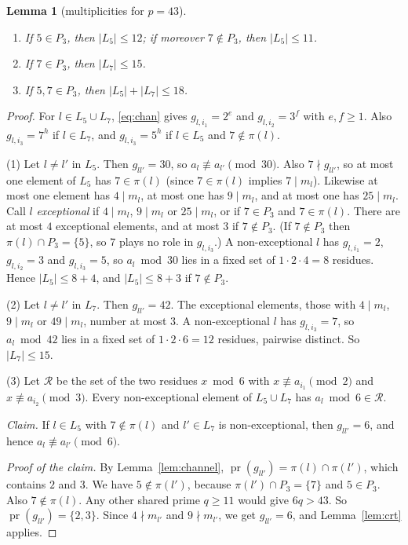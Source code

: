 \documentclass[11pt]{article}
\newtheorem{lemma}[theorem]{Lemma}
\theoremstyle{definition}
\theoremstyle{remark}
\newcommand{\pr}{\operatorname{pr}}
\begin{document}
\begin{lemma}[multiplicities for $p=43$]\label{lem:mult44}
\begin{enumerate}
\item If $5\in P_3$, then $|L_5|\le12$; if moreover $7\notin P_3$, then $|L_5|\le11$.
\item If $7\in P_3$, then $|L_7|\le15$.
\item If $5,7\in P_3$, then $|L_5|+|L_7|\le18$.
\end{enumerate}
\end{lemma}
\begin{proof}
For $l\in L_5\cup L_7$, \eqref{eq:chan} gives $g_{l,i_1}=2^{e}$ and $g_{l,i_2}=3^{f}$ with
$e,f\ge1$. Also $g_{l,i_3}=7^{h}$ if $l\in L_7$, and $g_{l,i_3}=5^{h}$ if $l\in L_5$ and
$7\notin\pi(l)$.

(1) Let $l\ne l'$ in $L_5$. Then $g_{ll'}=30$, so $a_l\not\equiv a_{l'}\pmod{30}$. Also
$7\nmid g_{ll'}$, so at most one element of $L_5$ has $7\in\pi(l)$ (since $7\in\pi(l)$ implies
$7\mid m_l$). Likewise at most one element has $4\mid m_l$, at most one has $9\mid m_l$, and at
most one has $25\mid m_l$. Call $l$ \emph{exceptional} if $4\mid m_l$, $9\mid m_l$ or
$25\mid m_l$, or if $7\in P_3$ and $7\in\pi(l)$. There are at most $4$ exceptional elements, and at
most $3$ if $7\notin P_3$. (If $7\notin P_3$ then $\pi(l)\cap P_3=\{5\}$, so $7$ plays no role in
$g_{l,i_3}$.) A non-exceptional $l$ has
$g_{l,i_1}=2$, $g_{l,i_2}=3$ and $g_{l,i_3}=5$, so $a_l\bmod30$ lies in a fixed set of
$1\cdot2\cdot4=8$ residues. Hence $|L_5|\le8+4$, and $|L_5|\le8+3$ if $7\notin P_3$.

(2) Let $l\ne l'$ in $L_7$. Then $g_{ll'}=42$. The exceptional elements, those with $4\mid m_l$,
$9\mid m_l$ or $49\mid m_l$, number at most $3$. A non-exceptional $l$ has $g_{l,i_3}=7$, so
$a_l\bmod42$ lies in a fixed set of $1\cdot2\cdot6=12$ residues, pairwise distinct. So
$|L_7|\le15$.

(3) Let $\mathcal R$ be the set of the two residues $x\bmod6$ with $x\not\equiv a_{i_1}\pmod2$
and $x\not\equiv a_{i_2}\pmod3$. Every non-exceptional element of $L_5\cup L_7$ has
$a_l\bmod6\in\mathcal R$.

\emph{Claim.} If $l\in L_5$ with $7\notin\pi(l)$ and $l'\in L_7$ is non-exceptional, then
$g_{ll'}=6$, and hence $a_l\not\equiv a_{l'}\pmod 6$.

\emph{Proof of the claim.} By Lemma~\ref{lem:channel}, $\pr(g_{ll'})=\pi(l)\cap\pi(l')$, which
contains $2$ and $3$. We have $5\notin\pi(l')$, because $\pi(l')\cap P_3=\{7\}$ and $5\in P_3$.
Also $7\notin\pi(l)$. Any other shared prime $q\ge11$ would give $6q>43$. So
$\pr(g_{ll'})=\{2,3\}$. Since $4\nmid m_{l'}$ and $9\nmid m_{l'}$, we get $g_{ll'}=6$, and
Lemma~\ref{lem:crt} applies.


\end{proof}
\end{document}
